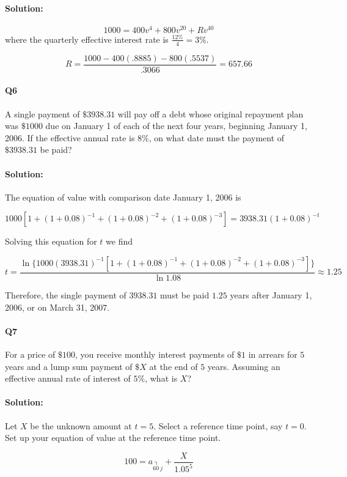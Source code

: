 \documentclass[a4paper, 11pt, twoside]{article}
\begin{document}
\paragraph{Solution:}

\[1000=400v^4+800v^{20}+Rv^{40}\] where the quarterly effective interest rate is $\frac{12\%}{4}=3\%$.

\[R=\frac{1000-400(.8885)-800(.5537)}{.3066}=657.66\]

\paragraph{Q6} A single payment of $\$3938.31$ will pay off a debt whose original repayment plan was $\$1000$ due on January 1 of each of the next four years, beginning January 1, 2006. If the effective annual rate is $8\%$, on what date must the payment of $\$3938.31$ be paid?

\paragraph{Solution:} The equation of value with comparison date January 1, 2006 is 

\[1000[1+(1+0.08)^{-1}+(1+0.08)^{-2}+ (1+0.08)^{-3}]=3938.31(1+0.08)^{-t}\]

Solving this equation for $t$ we find

\[t=\frac{\ln\{1000(3938.31)^{-1}[1+(1+0.08)^{-1}+(1+0.08)^{-2}+(1+0.08)^{-3}]\}}{\ln{1.08}}\approx 1.25\]

Therefore, the single payment of $3938.31$ must be paid $1.25$ years after January 1, 2006, or on March 31, 2007.

\paragraph{Q7} For a price of $\$100$, you receive monthly interest payments of $\$1$ in arrears for $5$ years and a lump sum payment of $\$X$ at the end of $5$ years. Assuming an effective annual rate of interest of $5\%$, what is $X$?

\paragraph{Solution:} Let $X$ be the unknown amount at $t=5$. Select a reference time point, say $t=0$. Set up your equation of value at the reference time point.

\[100=a_{\annuity{60\ }j}+\frac{X}{1.05^5}\]
\end{document}

